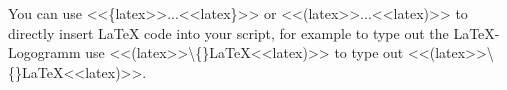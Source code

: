 
You can use {\mktsStyleCode{}<<\{latex>>...<<latex\}>>} or {\mktsStyleCode{}<<(latex>>...<<latex)>>} to directly insert LaTeX
code into your script, for example to type out
the LaTeX-Logogramm use {\mktsStyleCode{}<<(latex>>\textbackslash\{\}LaTeX<<latex)>>}
to type out <<(latex>>\textbackslash\{\}LaTeX<<latex)>>.\mktsShowpar\par


